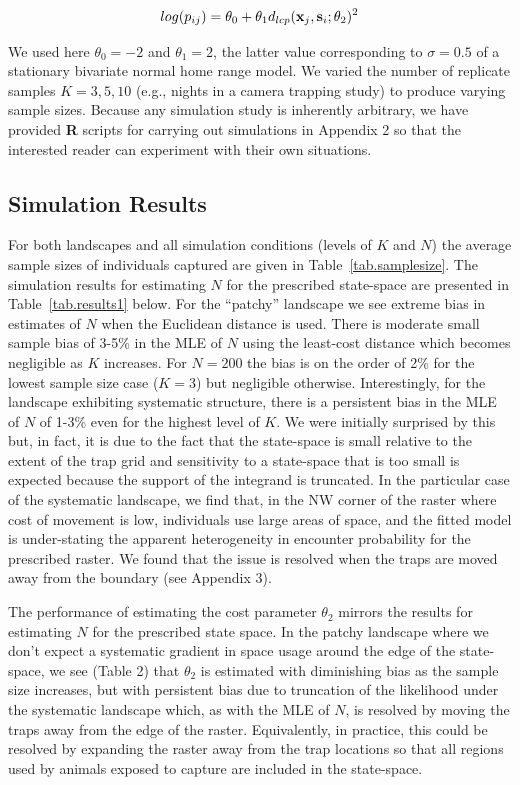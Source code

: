 \documentclass[12pt]{article}
\begin{document}
\begin{spacing}{1.8}
\[
log(p_{ij})= \theta_{0} + \theta_{1} d_{lcp}({\bf x}_{j},{\bf
  s}_{i}; \theta_{2})^{2}
\]

{\flushleft We } used here $\theta_{0} = -2$ and $\theta_{1} = 2$, the latter value
corresponding to $\sigma = 0.5$ of a stationary bivariate normal home
range model.  We varied the number of replicate samples $K=3,5,10$
(e.g., nights in a camera trapping study) to produce varying sample
sizes.  Because any simulation study is inherently arbitrary, we have
provided {\bf R} scripts for carrying out simulations in Appendix 2 so
that the interested reader can experiment with their own situations.




\subsection{Simulation Results}

For both landscapes and all simulation conditions (levels of $K$ and
$N$) the average sample sizes of individuals captured are given in
Table~\ref{tab.samplesize}.  The simulation results for estimating $N$
for the prescribed state-space are presented in
Table~\ref{tab.results1} below.  For the ``patchy'' landscape we see
extreme 
bias in estimates of $N$ when the Euclidean distance is used. There is
moderate small sample bias of 3-5\% in the MLE of $N$ using the
least-cost distance which becomes negligible as $K$ increases. For
$N=200$ the bias is on the order of 2\% for the lowest sample size
case ($K=3$) but negligible otherwise.  Interestingly, for the
landscape exhibiting systematic structure, there is a persistent bias
in the MLE of $N$ of 1-3\% even for the highest level of $K$. We were
initially surprised by this but, in fact, it is due to the fact that
the state-space is small relative to the extent of the trap grid and
sensitivity to a state-space that is too small is expected because the
support of the integrand is truncated. In the particular case of the
systematic landscape, we find that, in the NW corner of the raster
where cost of movement is low, individuals use large areas of space,
and the fitted model is under-stating the apparent
heterogeneity in encounter probability for the prescribed raster.  We
found that the issue is resolved when the traps are moved away from
the boundary (see Appendix 3).

The performance of estimating the cost parameter $\theta_{2}$ mirrors
the results for estimating $N$ for the prescribed state space. In the
patchy landscape where we don't expect a systematic gradient in space
usage around the edge of the state-space, we see
(Table 2) that $\theta_{2}$ is estimated with
diminishing bias as the sample size increases, but with persistent
bias due to truncation of the likelihood under the systematic
landscape which, as with the MLE of $N$, is resolved by moving the
traps away from the edge of the raster. Equivalently, in practice,
this could be resolved by expanding the raster away from the trap
locations so that all regions used by animals exposed to capture are
included in the state-space.







\end{spacing}
\end{document}
